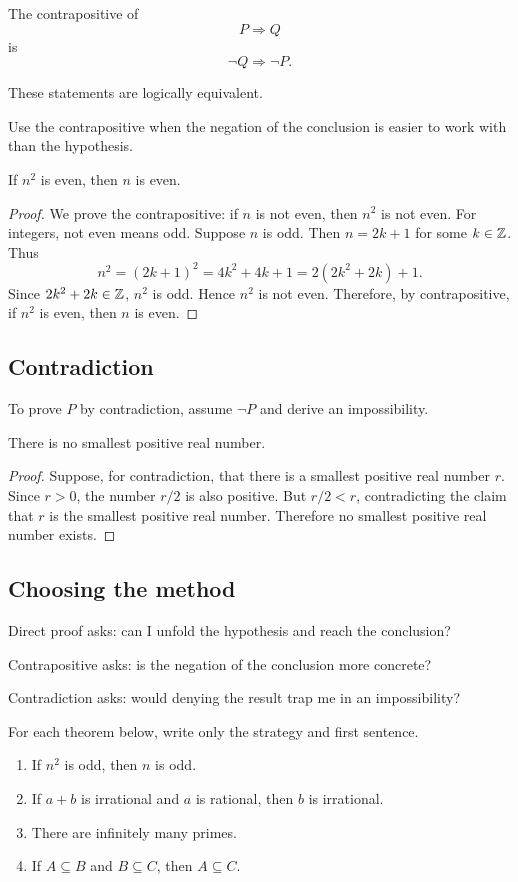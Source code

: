 \documentclass[12pt]{article}
\begin{document}
The contrapositive of
\[
P\Rightarrow Q
\]
is
\[
\neg Q\Rightarrow\neg P.
\]

These statements are logically equivalent.

Use the contrapositive when the negation of the conclusion is easier to work with than the hypothesis.

\begin{theorem}
If $n^2$ is even, then $n$ is even.
\end{theorem}

\begin{proof}
We prove the contrapositive: if $n$ is not even, then $n^2$ is not even. For integers, not even means odd. Suppose $n$ is odd. Then $n=2k+1$ for some $k\in\mathbb{Z}$. Thus
\[
n^2=(2k+1)^2=4k^2+4k+1=2(2k^2+2k)+1.
\]
Since $2k^2+2k\in\mathbb{Z}$, $n^2$ is odd. Hence $n^2$ is not even. Therefore, by contrapositive, if $n^2$ is even, then $n$ is even.
\end{proof}

\subsection{Contradiction}

To prove $P$ by contradiction, assume $\neg P$ and derive an impossibility.

\begin{theorem}
There is no smallest positive real number.
\end{theorem}

\begin{proof}
Suppose, for contradiction, that there is a smallest positive real number $r$. Since $r>0$, the number $r/2$ is also positive. But $r/2<r$, contradicting the claim that $r$ is the smallest positive real number. Therefore no smallest positive real number exists.
\end{proof}

\subsection{Choosing the method}

Direct proof asks: can I unfold the hypothesis and reach the conclusion?

Contrapositive asks: is the negation of the conclusion more concrete?

Contradiction asks: would denying the result trap me in an impossibility?

\begin{labbox}
For each theorem below, write only the strategy and first sentence.
\begin{enumerate}
\item If $n^2$ is odd, then $n$ is odd.
\item If $a+b$ is irrational and $a$ is rational, then $b$ is irrational.
\item There are infinitely many primes.
\item If $A\subseteq B$ and $B\subseteq C$, then $A\subseteq C$.
\end{enumerate}
\end{labbox}
\end{document}
